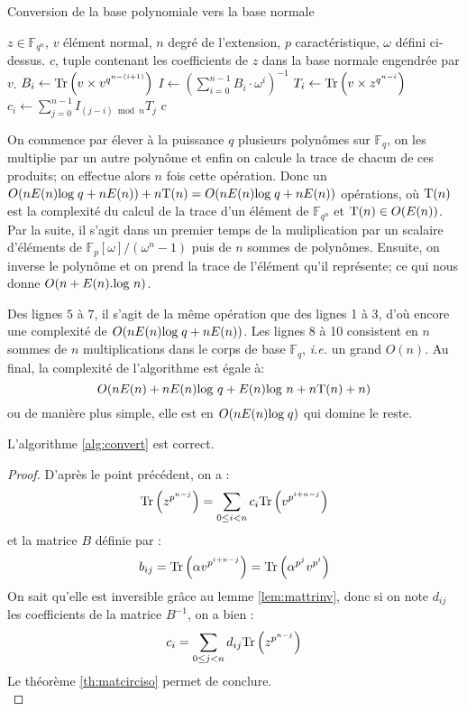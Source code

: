 \documentclass[a4paper]{article} %
\numberwithin{section}{part}
\numberwithin{equation}{section}
\newcommand\GF[1]{\mathbb{F}_{#1}}
\newcommand\Tr[1]{\textup{Tr}\left(#1\right)}
\begin{document}
\begin{algorithm}
\caption{Conversion de la base polynomiale vers la base normale}
\label{alg:convert}
\begin{algorithmic}[1]
\REQUIRE $z\in\GF{q^n}$, $v$ élément normal, $n$ degré de l'extension, $p$ 
caractéristique, $\omega$ défini ci-dessus.
\ENSURE $c$, tuple contenant les coefficients de $z$ dans la base 
normale engendrée par $v$.
\bigskip
{}
    \STATE $B_i \leftarrow \Tr{v\times v^{q^{n-(i+1)}}}$
\ENDFOR
\STATE $I \leftarrow (\sum_{i = 0}^{n-1}{B_i\cdot \omega^i})^{-1}$
    \STATE $T_i \leftarrow \Tr{v\times z^{q^{n-i}}}$
\ENDFOR
{}
    \STATE $c_i \leftarrow \sum_{j=0}^{n-1}{I_{(j-i)\bmod n}T_j}$
\ENDFOR
\RETURN $c$

\end{algorithmic}
\end{algorithm}
On commence par élever à la puissance $q$ plusieurs polynômes sur $\GF{q}$, 
on les multiplie par un autre polynôme et enfin on calcule la trace de chacun 
de ces produits; on effectue alors $n$ fois cette opération. Donc un 
$O(nE(n)\textup{log}\;q + nE(n)) + n\textup{T}(n) = O(nE(n)\textup{log}\;q + 
nE(n))$ opérations, 
où $\textup{T}(n)$ est la complexité du calcul de la trace d'un élément
de $\GF{q^n}$ et $\textup{T}(n) \in O(E(n))$.
Par la suite, il s'agit dans un premier temps de la muliplication par un 
scalaire d'éléments de $\mathbb{F}_p[\omega]/(\omega^n - 1)$ puis de $n$ sommes 
de polynômes. Ensuite, on inverse le polynôme et on prend la trace de l'élément 
qu'il représente; ce qui nous donne $O(n + E(n).\textup{log }n)$.\par
Des lignes $5$ à $7$, il s'agit de la même opération que des lignes 1 à 3, d'où 
encore une complexité de $O(nE(n)\textup{log}\;q + nE(n))$.
Les lignes 8 à 10 consistent en $n$ sommes de $n$ multiplications dans le corps 
de base $\GF{q}$, \textit{i.e.} un grand $O(n)$.
Au final, la complexité de l'algorithme est égale à:
\[O(nE(n) + nE(n)\textup{log }q +  E(n)\textup{log }n + n\textup{T}(n) + n)\] 
ou de manière plus simple, elle est en $O(nE(n)\textup{log}\;q)$ qui domine le 
reste.

\begin{prop}
L'algorithme \ref{alg:convert} est correct.
\end{prop}
\begin{proof}
D'après le point précédent, on a :
\[\textup{Tr}\left(z^{p^{n-j}}\right) = \sum_{0\leq i < n}{c_i\textup{Tr}
\left(v^{p^{i+n-j}}\right)}\]
et la matrice $B$ définie par :
\[b_{ij} = \Tr{\alpha v^{p^{i+n-j}}} = \Tr{\alpha^{p^j}v^{p^i}}\]
On sait qu'elle est inversible grâce au lemme \ref{lem:mattrinv}, donc si on
note $d_{ij}$ les coefficients de la matrice $B^{-1}$, on a bien :
\[c_i = \sum_{0\leq j < n}{d_{ij}\textup{Tr}\left(z^{p^{n-j}}\right)}\]
Le théorème \ref{th:matcirciso} permet de conclure.\\
\end{proof}
\end{document}
